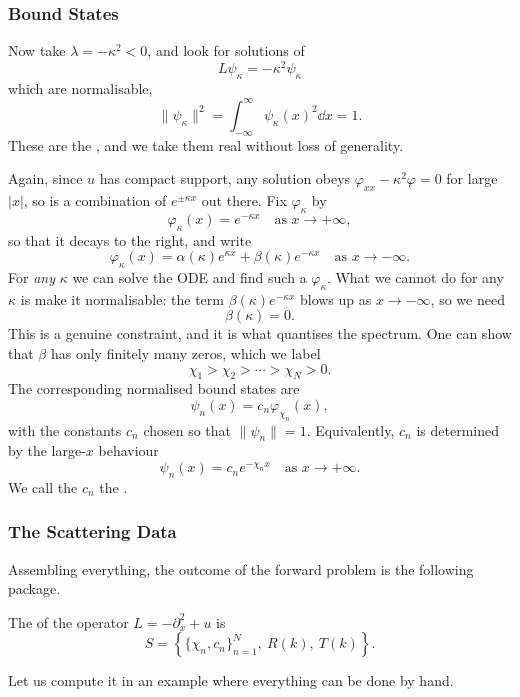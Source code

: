 \documentclass[a4paper]{scrartcl}
\begin{document}
\subsubsection{Bound States}

Now take $\lambda = -\kappa^2 < 0$, and look for solutions of
$$
L\psi_\kappa = -\kappa^2\psi_\kappa
$$
which are normalisable,
$$
\|\psi_\kappa\|^2 = \int_{-\infty}^\infty\psi_\kappa(x)^2\dd x = 1.
$$
These are the , and we take them real without loss of generality.

Again, since $u$ has compact support, any solution obeys $\varphi_{xx} - \kappa^2\varphi = 0$ for large $|x|$, so is a combination of $e^{\pm\kappa x}$ out there. Fix $\varphi_\kappa$ by
$$
\varphi_\kappa(x) = e^{-\kappa x}\quad\text{as }x\to+\infty,
$$
so that it decays to the right, and write
$$
\varphi_\kappa(x) = \alpha(\kappa)e^{\kappa x} + \beta(\kappa)e^{-\kappa x}\quad\text{as }x\to-\infty.
$$
For \emph{any} $\kappa$ we can solve the ODE and find such a $\varphi_\kappa$. What we cannot do for any $\kappa$ is make it normalisable: the term $\beta(\kappa)e^{-\kappa x}$ blows up as $x\to-\infty$, so we need
$$
\beta(\kappa) = 0.
$$
This is a genuine constraint, and it is what quantises the spectrum. One can show that $\beta$ has only finitely many zeros, which we label
$$
\chi_1 > \chi_2 > \cdots > \chi_N > 0.
$$
The corresponding normalised bound states are
$$
\psi_n(x) = c_n\varphi_{\chi_n}(x),
$$
with the constants $c_n$ chosen so that $\|\psi_n\| = 1$. Equivalently, $c_n$ is determined by the large-$x$ behaviour
$$
\psi_n(x) = c_ne^{-\chi_n x}\quad\text{as }x\to+\infty.
$$
We call the $c_n$ the .

\subsubsection{The Scattering Data}

Assembling everything, the outcome of the forward problem is the following package.

\begin{definition}
	The  of the operator $L = -\partial_x^2 + u$ is
	$$
	S = \left\{\{\chi_n, c_n\}_{n=1}^N,\ R(k),\ T(k)\right\}.
	$$
\end{definition}

Let us compute it in an example where everything can be done by hand.
\end{document}
